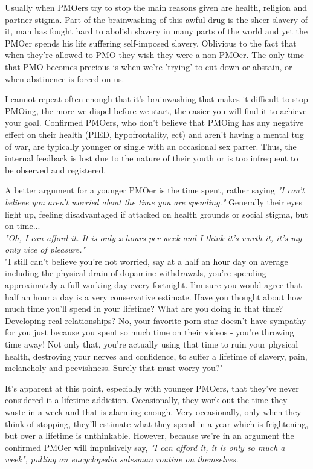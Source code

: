 \documentclass[easypeasy.tex]{subfiles}
\begin{document}
Usually when PMOers try to stop the main reasons given are health, religion and partner stigma. Part of the brainwashing of this awful drug is the sheer slavery of it, man has fought hard to abolish slavery in many parts of the world and yet the PMOer spends his life suffering self-imposed slavery. Oblivious to the fact that when they're allowed to PMO they wish they were a non-PMOer. The only time that PMO becomes precious is when we're 'trying' to cut down or abstain, or when abstinence is forced on us.

I cannot repeat often enough that it's brainwashing that makes it difficult to stop PMOing, the more we dispel before we start, the easier you will find it to achieve your goal. Confirmed PMOers, who don't believe that PMOing has any negative effect on their health (PIED, hypofrontality, ect) and aren't having a mental tug of war, are typically younger or single with an occasional sex parter. Thus, the internal feedback is lost due to the nature of their youth or is too infrequent to be observed and registered.

A better argument for a younger PMOer is the time spent, rather saying \textit{"I can't believe you aren't worried about the time you are spending."} Generally their eyes light up, feeling disadvantaged if attacked on health grounds or social stigma, but on time...\\
  \textit{"Oh, I can afford it. It is only x hours per week and I think it's worth it, it's my only vice of pleasure."}\\
  "I still can't believe you're not worried, say at a half an hour day on average including the physical drain of dopamine withdrawals, you're spending approximately a full working day every fortnight. I'm sure you would agree that half an hour a day is a very conservative estimate. Have you thought about how much time you'll spend in your lifetime? What are you doing in that time? Developing real relationships? No, your favorite porn star doesn't have sympathy for you just because you spent so much time on their videos - you're throwing time away! Not only that, you're actually using that time to ruin your physical health, destroying your nerves and confidence, to suffer a lifetime of slavery, pain, melancholy and peevishness. Surely that must worry you?"

It's apparent at this point, especially with younger PMOers, that they've never considered it a lifetime addiction. Occasionally, they work out the time they waste in a week and that is alarming enough. Very occasionally, only when they think of stopping, they'll estimate what they spend in a year which is frightening, but over a lifetime is unthinkable. However, because we're in an argument the confirmed PMOer will impulsively say, \textit{"I can afford it, it is only so much a week", pulling an encyclopedia salesman routine on themselves.}
\end{document}
